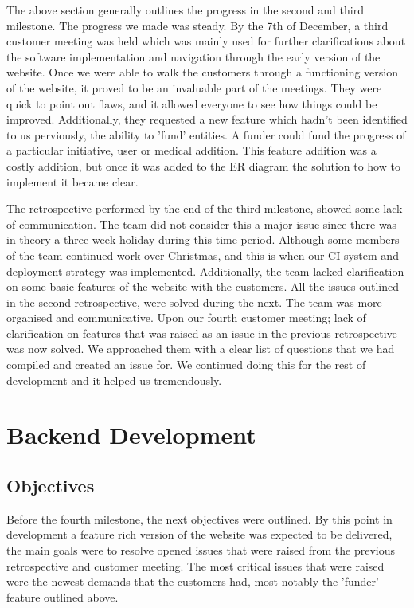 \documentclass{l3proj}
\begin{document}
The above section generally outlines the progress in the second and third milestone. The progress we made was steady. By the 7th of December, a third customer meeting was held which was mainly used for further clarifications about the software implementation and navigation through the early version of the website. Once we were able to walk the customers through a functioning version of the website, it proved to be an invaluable part of the meetings. They were quick to point out flaws, and it allowed everyone to see how things could be improved. Additionally, they requested a new feature which hadn't been identified to us perviously, the ability to 'fund' entities. A funder could fund the progress of a particular initiative, user or medical addition. This feature addition was a costly addition, but once it was added to the ER diagram the solution to how to implement it became clear.

The retrospective performed by the end of the third milestone, showed some lack of communication. The team did not consider this a major issue since there was in theory a three week holiday during this time period. Although some members of the team continued work over Christmas, and this is when our CI system and deployment strategy was implemented. Additionally, the team lacked clarification on some basic features of the website with the customers. All the issues outlined in the second retrospective, were solved during the next. The team was more organised and communicative. Upon our fourth customer meeting; lack of clarification on features that was raised as an issue in the previous retrospective was now solved. We approached them with a clear list of questions that we had compiled and created an issue for. We continued doing this for the rest of development and it helped us tremendously.

\section{Backend Development}
\label{sec:backend}

\subsection{Objectives}
\label{sec:backend-objectives}

Before the fourth milestone, the next objectives were outlined. By this point in development a feature rich version of the website was expected to be delivered, the main goals were to resolve opened issues that were raised from the previous retrospective and customer meeting. The most critical issues that were raised were the newest demands that the customers had, most notably the 'funder' feature outlined above.
\end{document}

